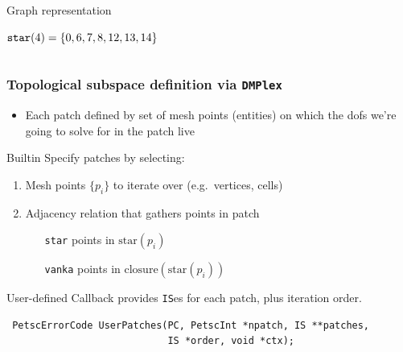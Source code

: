 \documentclass[presentation,aspectratio=43, 10pt]{beamer}
\begin{document}
\begin{frame}[t]
\begin{columns}[T]
\begin{column}{0.6\textwidth}
\begin{block}{Graph representation}
\begin{onlyenv}
\begin{center}
          \end{center}
          $\text{\texttt{star}}(4) = \{0, 6, 7, 8, 12, 13, 14\}$
        \end{onlyenv}
      \end{block}
    \end{column}
  \end{columns}
\end{frame}

\begin{frame}[fragile]
 \frametitle{Topological subspace definition via \texttt{DMPlex}}
 \begin{itemize}
 \item Each patch defined by set of mesh points (entities) on which the dofs
   we're going to solve for in the patch live
 \end{itemize}
 \begin{block}{Builtin}
   Specify patches by selecting:
   \begin{enumerate}
   \item Mesh points $\{p_i\}$ to iterate over (e.g.~vertices, cells)
   \item Adjacency relation that gathers points in patch
     \begin{itemize}
     \item[\texttt{star}] points in $\text{star}(p_i)$
     \item[\texttt{vanka}] points in $\text{closure}(\text{star}(p_i))$
     \end{itemize}
   \end{enumerate}
 \end{block}
 \begin{block}{User-defined}
   Callback provides \texttt{IS}es for each patch, plus iteration order.
\begin{verbatim}
 PetscErrorCode UserPatches(PC, PetscInt *npatch, IS **patches,
                            IS *order, void *ctx);
\end{verbatim}
 \end{block}
\end{frame}
\end{document}
